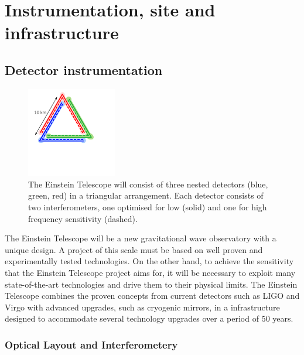 \vspace{0.5cm}
\chapter{Instrumentation, site and infrastructure}

\section{Detector instrumentation}
\label{chap:Detector}

{\begin{figure}
\vspace{-0.5cm}
	\centering
		\includegraphics[width=0.35\textwidth]{Figures/ET_simpleB.pdf}
	\caption{The Einstein Telescope will consist of three nested detectors (blue, green, red) in a triangular arrangement. Each detector consists of two interferometers, one optimised for low (solid) and one for high frequency sensitivity (dashed).}
	\label{fig:NestedDetectors}
\end{figure}

The Einstein Telescope will be a new gravitational wave observatory with a unique design.
A project of this scale must be based on well proven and
experimentally tested technologies. On the other hand, to achieve the sensitivity that the Einstein Telescope
project aims for, it will be necessary to exploit many
state-of-the-art technologies and drive them to their physical limits.
The Einstein Telescope combines the proven concepts from current 
detectors such as LIGO and Virgo with advanced upgrades,
such as cryogenic mirrors, in a infrastructure designed to 
accommodate several technology upgrades over a period of 50 years.

\subsection {Optical Layout and Interferometery}
\label{Sec:Layout}

}
